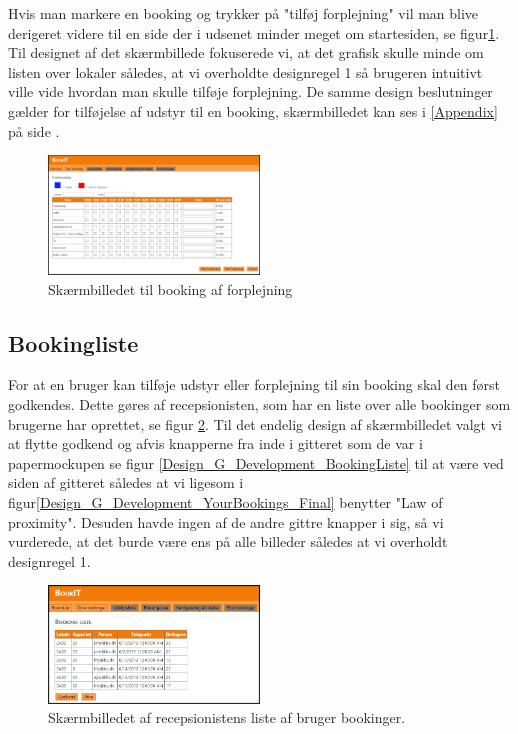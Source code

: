 Hvis man markere en booking og trykker på "tilføj forplejning" vil man blive derigeret videre til en side der i udsenet minder meget om startesiden, se figur\ref{Design_G_Development_Forplejning_Final}. Til designet af det skærmbillede fokuserede vi, at det grafisk skulle minde om listen over lokaler således, at vi overholdte designregel 1 så brugeren intuitivt ville vide hvordan man skulle tilføje forplejning. De samme design beslutninger gælder for tilføjelse af udstyr til en booking, skærmbilledet kan ses i  \ref{Appendix} på side \pageref{Appendix}.

\begin{figure}[h!]
  \centering
    \includegraphics[width=0.5\textwidth]{Appendix/GUI-Prototype/DigitalMockup/Forplejning}
  \caption{Skærmbilledet til booking af forplejning}
\label{Design_G_Development_Forplejning_Final}
\end{figure} 

\subsection{Bookingliste}
For at en bruger kan tilføje udstyr eller forplejning til sin booking skal den først godkendes. Dette gøres af recepsionisten, som har en liste over alle bookinger som brugerne har oprettet, se figur \ref{Design_G_Development_BookingListe_Final}. Til det endelig design af skærmbilledet valgt vi at flytte godkend og afvis knapperne fra inde i gitteret som de var i papermockupen se figur \ref{Design_G_Development_BookingListe} til at være ved siden af gitteret således at vi ligesom i figur\ref{Design_G_Development_YourBookings_Final} benytter "Law of proximity". Desuden havde ingen af de andre gittre knapper i sig, så vi vurderede, at det burde være ens på alle billeder således at vi overholdt designregel 1.

\begin{figure}[h!]
  \centering
    \includegraphics[width=0.5\textwidth]{Appendix/GUI-Prototype/DigitalMockup/BookingListe}
  \caption{Skærmbilledet af recepsionistens liste af bruger bookinger.}
\label{Design_G_Development_BookingListe_Final}
\end{figure} 


